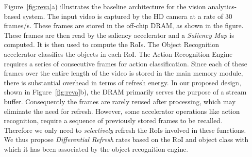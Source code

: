 
\begin{figure*}[ht!]
\begin{minipage}[b]{0.36\linewidth}
\raggedleft
{}
\caption{\label{fig:reva}a) Baseline architecture}
\end{minipage}
\addtocounter{figure}{-1}
\begin{minipage}[b]{0.37\linewidth}
\centering
{}
\caption{\label{fig:reva}b) Architecture of Proposed System}
\end{minipage}
\addtocounter{figure}{-1}
\begin{minipage}[b]{0.25\linewidth}
\raggedright
{}
\caption{\label{fig:reva}c) Design of REVA block}
\end{minipage}
\vspace{-0.1in}
\end{figure*}


Figure~\ref{fig:reva}a) illustrates the baseline architecture for the vision analytics-based system. The input video is captured by the HD camera at a rate of 30 frames/s. 
These frames are stored in the off-chip DRAM, as shown in the figure. These frames are then read by the saliency accelerator and a \emph{Saliency Map} is computed. It is then used to compute the RoIs. The Object Recognition accelerator classifies the objects in each RoI. The Action Recognition Engine requires a series of consecutive frames for action classification. Since each of these frames over the entire length of the video is stored in the main memory module, there is substantial overhead in terms of refresh energy. In our proposed design, shown in Figure~\ref{fig:reva}b), the DRAM primarily serves the purpose of a stream buffer. Consequently the frames are rarely reused after processing, which may eliminate the need for refresh. 
However, some accelerator operations like action recognition, require a sequence of previously stored frames to be recalled. Therefore we only need to \emph{selectively} refresh the RoIs involved in these functions. We thus propose \emph{Differential Refresh} rates based on the RoI and object class with which it has been associated by the object recognition engine.

